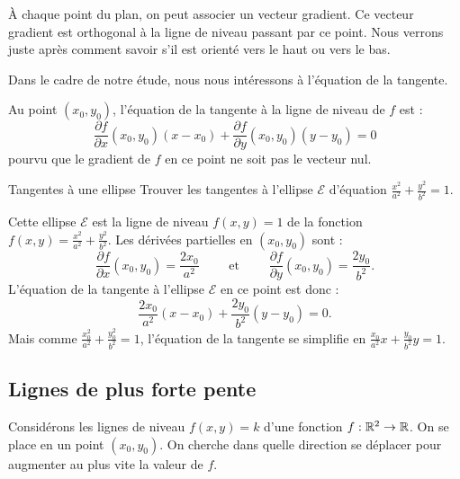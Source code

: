 \bigskip


À chaque point du plan, on peut associer un vecteur gradient. Ce vecteur gradient est orthogonal à la ligne de niveau passant par ce point. Nous verrons juste après comment savoir s'il est orienté \og{}vers le haut\fg{} ou \og{}vers le bas\fg{}. 


Dans le cadre de notre étude, nous nous intéressons à l'équation de la tangente.
\begin{proposition}{}{}
	Au point $(x_0,y_0)$, l'équation de la tangente à la ligne de niveau de $f$ est :
	$$\frac{\partial f}{\partial x}(x_0,y_0)(x-x_0)+\frac{\partial f}{\partial y}(x_0,y_0)(y-y_0)=0$$
	pourvu que le gradient de $f$ en ce point ne soit pas le vecteur nul.
\end{proposition}



\begin{exemple}{Tangentes à une ellipse}{}
	Trouver les tangentes à l'ellipse $\mathcal{E}$ d'équation $\frac{x^2}{a^2}+\frac{y^2}{b^2} = 1$.
	
	
	Cette ellipse $\mathcal{E}$ est la ligne de niveau $f(x,y)=1$ de la fonction
	$f(x,y) = \frac{x^2}{a^2}+\frac{y^2}{b^2}$. 
	Les dérivées partielles en $(x_0, y_0)$ sont :
	$$\frac{\partial f}{\partial x}(x_0,y_0) = \frac{2x_0}{a^2} \qquad \text{ et } \qquad \frac{\partial f}{\partial y}(x_0,y_0) = \frac{2y_0}{b^2}.$$
	L'équation de la tangente à l'ellipse $\mathcal{E}$ en ce point est donc :
	$$\frac{2x_0}{a^2}(x-x_0)+\frac{2y_0}{b^2}(y-y_0)=0.$$
	Mais comme $\frac{x_0^2}{a^2}+\frac{y_0^2}{b^2} = 1$, l'équation de la tangente se simplifie en $\displaystyle \frac{x_0}{a^2}x + \frac{y_0}{b^2} y = 1$.
\end{exemple}


\subsection{Lignes de plus forte pente}

Considérons les lignes de niveau $f(x,y)=k$ d'une fonction $f : \mathbb{R}^2 \to \mathbb{R}$.
On se place en un point $(x_0,y_0)$. On cherche dans quelle direction se déplacer pour augmenter au plus vite la valeur de $f$.

